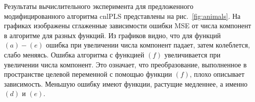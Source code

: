 \documentclass[12pt,twoside]{article}
\begin{document}

Результаты вычислительного эксперимента для предложенного модифицированного алгоритма cnlPLS представлены на рис.~\ref{fig:animals}. На графиках изображены сглаженные зависимости ошибки MSE от числа компонент в алгоритме для разных функций. Из графиков видно, что для функций $(a)-(e)$ ошибка при увеличении числа компонент падает, затем колеблется, слабо меняясь. Ошибка алгоритма с функцией $(f)$ увеличивается при увеличении числа компонент. Это означает, что преобразование, выполненное в пространстве целевой переменной с помощью функции $(f)$, плохо описывает зависимость. Меньшую ошибку имеют функции, растущие медленнее, а именно $(d)$ и $(e)$. 



\end{document}
